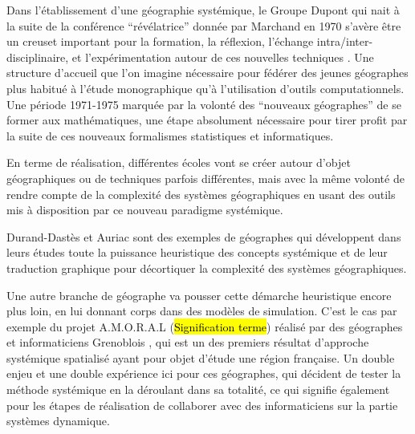 
Dans l'établissement d'une géographie systémique, le Groupe Dupont qui nait à la suite de la conférence \enquote{révélatrice} donnée par Marchand en 1970 s'avère être un creuset important pour la formation, la réflexion, l'échange intra/inter-disciplinaire, et l'expérimentation autour de ces nouvelles techniques \autocites[2]{LeBerre1987}[125-128]{Pumain2002}. Une structure d'accueil que l'on imagine nécessaire pour fédérer des jeunes géographes plus habitué à l'étude monographique qu'à l'utilisation d'outils computationnels. Une période 1971-1975 marquée par la volonté des \enquote{nouveaux géographes} de se former aux mathématiques, une étape absolument nécessaire pour tirer profit par la suite de ces nouveaux formalismes statistiques et informatiques. 

En terme de réalisation, différentes écoles vont se créer autour d'objet géographiques ou de techniques parfois différentes, mais avec la même volonté de rendre compte de la complexité des systèmes géographiques en usant des outils mis à disposition par ce nouveau paradigme systémique. 

Durand-Dastès et Auriac sont des exemples de géographes qui développent dans leurs études toute la puissance heuristique des concepts systémique et de leur traduction graphique pour décortiquer la complexité des systèmes géographiques.

Une autre branche de géographe va pousser cette démarche heuristique encore plus loin, en lui donnant corps dans des modèles de simulation. C'est le cas par exemple du projet A.M.O.R.A.L (\hl{Signification terme}) réalisé par des géographes et informaticiens Grenoblois \autocite{1984}, qui est un des premiers résultat d'approche systémique spatialisé ayant pour objet d'étude une région française. Un double enjeu et une double expérience ici pour ces géographes, qui décident de tester la méthode systémique en la déroulant dans sa totalité, ce qui signifie également pour les étapes de réalisation de collaborer avec des informaticiens sur la partie systèmes dynamique. \autocite{Guermond84, LeBerre1987}


